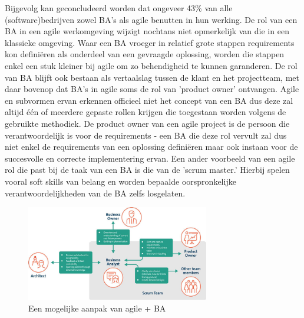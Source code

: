 \documentclass{hogent-article}
\begin{document}
Bijgevolg kan geconcludeerd worden dat ongeveer 43\% van alle (software)bedrijven zowel BA's 
als agile benutten in hun werking. De rol van een BA in een agile werkomgeving wijzigt nochtans
niet opmerkelijk van die in een klassieke omgeving. Waar een BA vroeger in relatief grote stappen
requirements kon definiëren als onderdeel van een gevraagde oplossing, worden die stappen enkel
een stuk kleiner bij agile om zo behendigheid te kunnen garanderen. De rol van BA blijft 
ook bestaan als vertaalslag tussen de klant en het projectteam, met daar bovenop
dat BA's in agile soms de rol van 'product owner' ontvangen. Agile en subvormen ervan 
erkennen officieel niet het concept van een BA dus deze zal altijd één of meerdere gepaste 
rollen krijgen die toegestaan worden volgens de gebruikte methodiek. De product owner van 
een agile project is de persoon die verantwoordelijk is voor de requirements - een BA die deze rol
vervult zal dus niet enkel de requirements van een oplossing definiëren maar ook instaan voor
de succesvolle en correcte implementering ervan. Een ander voorbeeld van een agile rol die 
past bij de taak van een BA is die van de 'scrum master.' Hierbij spelen vooral soft skills 
van belang en worden bepaalde oorspronkelijke verantwoordelijkheden van de BA zelfs losgelaten. \autocite{agilebado} \autocite{nicole} \autocite{indian}
\begin{figure}[!ht]
  \centering
  \includegraphics[width=8cm]{./img/agileBA.jpg}
  \setlength{\abovecaptionskip}{0.5cm}
  \caption{Een mogelijke aanpak van agile + BA}
\end{figure}
\end{document}
